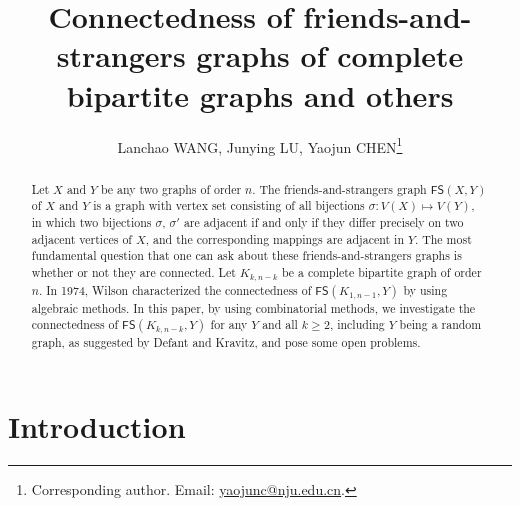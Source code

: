 \documentclass[11pt]{article}
\newcommand{\FS}{\mathsf{FS}}
\begin{document}
\title{Connectedness of friends-and-strangers graphs of complete bipartite graphs and others}


\author{Lanchao WANG, Junying LU, Yaojun CHEN\thanks{Corresponding author. 
 Email: \href{mailto://yaojunc@nju.edu.cn}{ yaojunc@nju.edu.cn}.
}}
\date{}
\maketitle

\begin{abstract}

Let $X$ and $Y$ be any two graphs of order $n$. The friends-and-strangers graph $\mathsf{FS}(X,Y)$ of $X$ and $Y$ is a graph with vertex set consisting of all bijections $\sigma :V(X) \mapsto V(Y)$, in which two bijections $\sigma$, $\sigma'$ are adjacent if and only if they differ precisely on two adjacent vertices of $X$, and the corresponding mappings are adjacent in $Y$. The most fundamental question that one can ask about these friends-and-strangers graphs is whether or not they are connected.  Let $K_{k,n-k}$ be a complete bipartite graph of order $n$. In 1974, Wilson characterized the connectedness of $\mathsf{FS}(K_{1,n-1},Y)$ by using algebraic methods.
In this paper, by using combinatorial methods,  we investigate the connectedness of  $\mathsf{FS}(K_{k,n-k},Y)$ for any $Y$ and all  $k\ge 2$, 
including $Y$ being a random graph, as suggested by Defant and Kravitz, and  pose some open problems.



\end{abstract}

\maketitle
\section{Introduction}
\end{document}
